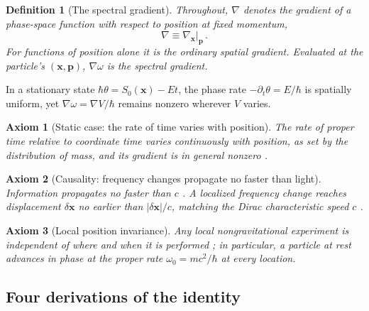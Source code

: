 \documentclass[aps,prd,onecolumn,tightenlines,nofootinbib,notitlepage,10pt,floatfix]{revtex4-2}
\theoremstyle{indentedtheorem}
\newtheorem{definition}{Definition}
\newtheorem{axiom}{Axiom}
\begin{document}
\begin{definition}[The spectral gradient]\label{def:spectral_gradient}
Throughout, $\nabla$ denotes the gradient of a phase-space function with respect to position at fixed momentum,
\begin{equation}
    \nabla \equiv \nabla_{\mathbf{x}}\big|_{\mathbf{p}} \, .
    \label{eq:gradient_def}
\end{equation}
For functions of position alone it is the ordinary spatial gradient. Evaluated at the particle's $(\mathbf{x},\mathbf{p})$, $\nabla\omega$ is the \emph{spectral gradient}.
\end{definition}

\noindent In a stationary state $\hbar\theta=S_0(\mathbf{x})-Et$, the phase rate $-\partial_t\theta=E/\hbar$ is spatially uniform, yet $\nabla\omega=\nabla V/\hbar$ remains nonzero wherever $V$ varies.

\begin{axiom}[Static case: the rate of time varies with position]\label{ax:nonzero_spectral_gradient}
The rate of proper time relative to coordinate time varies continuously with position, as set by the distribution of mass, and its gradient is in general nonzero \citep{Einstein1907Relativitatsprinzip,Einstein1911Influence,Pound1960Apparent,Bothwell2022Resolving}.
\end{axiom}

\begin{axiom}[Causality: frequency changes propagate no faster than light]\label{ax:causal_propagation}
Information propagates no faster than $c$ \citep{Einstein1905Electrodynamics}. A localized frequency change reaches displacement $\delta\mathbf{x}$ no earlier than $|\delta\mathbf{x}|/c$, matching the Dirac characteristic speed $c$ \citep{Thaller1992Dirac}.
\end{axiom}

\begin{axiom}[Local position invariance]\label{ax:lpi}
Any local nongravitational experiment is independent of where and when it is performed \citep{Will2014Confrontation}; in particular, a particle at rest advances in phase at the proper rate $\omega_0=mc^2/\hbar$ at every location.
\end{axiom}

\subsection{Four derivations of the identity}
\label{sec:deriv}
\end{document}
